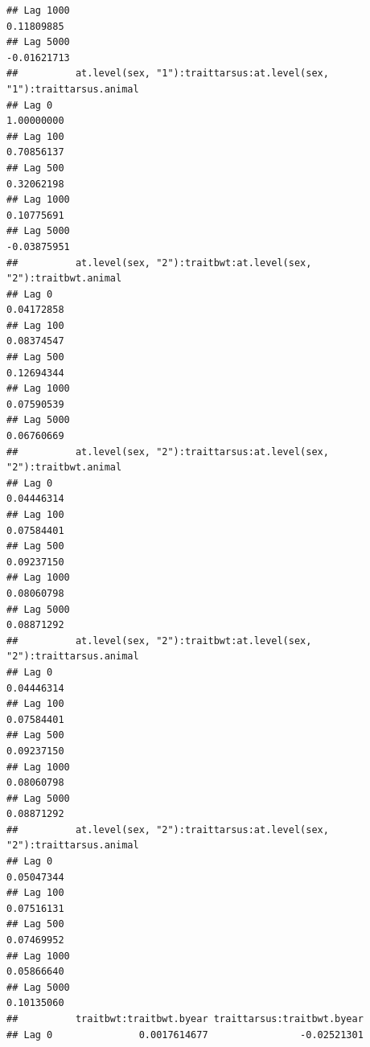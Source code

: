 \documentclass[
  12pt,
]{book}
\begin{document}
\begin{verbatim}
## Lag 1000                                                        0.11809885
## Lag 5000                                                       -0.01621713
##          at.level(sex, "1"):traittarsus:at.level(sex, "1"):traittarsus.animal
## Lag 0                                                              1.00000000
## Lag 100                                                            0.70856137
## Lag 500                                                            0.32062198
## Lag 1000                                                           0.10775691
## Lag 5000                                                          -0.03875951
##          at.level(sex, "2"):traitbwt:at.level(sex, "2"):traitbwt.animal
## Lag 0                                                        0.04172858
## Lag 100                                                      0.08374547
## Lag 500                                                      0.12694344
## Lag 1000                                                     0.07590539
## Lag 5000                                                     0.06760669
##          at.level(sex, "2"):traittarsus:at.level(sex, "2"):traitbwt.animal
## Lag 0                                                           0.04446314
## Lag 100                                                         0.07584401
## Lag 500                                                         0.09237150
## Lag 1000                                                        0.08060798
## Lag 5000                                                        0.08871292
##          at.level(sex, "2"):traitbwt:at.level(sex, "2"):traittarsus.animal
## Lag 0                                                           0.04446314
## Lag 100                                                         0.07584401
## Lag 500                                                         0.09237150
## Lag 1000                                                        0.08060798
## Lag 5000                                                        0.08871292
##          at.level(sex, "2"):traittarsus:at.level(sex, "2"):traittarsus.animal
## Lag 0                                                              0.05047344
## Lag 100                                                            0.07516131
## Lag 500                                                            0.07469952
## Lag 1000                                                           0.05866640
## Lag 5000                                                           0.10135060
##          traitbwt:traitbwt.byear traittarsus:traitbwt.byear
## Lag 0               0.0017614677                -0.02521301

\end{verbatim}
\end{document}
